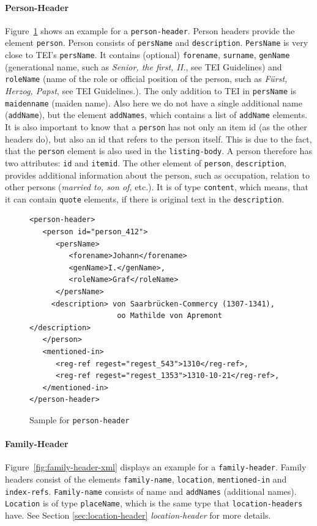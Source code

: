 \paragraph{Person-Header}
\label{sec:person-header}
Figure~\ref{fig:person-header-xml} shows an example for a \texttt{person-header}. Person headers provide the element \texttt{person}. Person consists of \texttt{persName} and \texttt{description}. \texttt{PersName} is very close to TEI's \texttt{persName}. It contains (optional) \texttt{forename}, \texttt{surname}, \texttt{genName} (generational name, such as \textit{Senior, the first, II.}, see TEI Guidelines) and \texttt{roleName} (name of the role or official position of the person, such as \textit{Fürst, Herzog, Papst}, see TEI Guidelines.). The only addition to TEI in \texttt{persName} is \texttt{maidenname} (maiden name). Also here we do not have a single additional name (\texttt{addName}), but the element \texttt{addNames}, which contains a list of \texttt{addName} elements. It is also important to know that a \texttt{person} has not only an item id (as the other headers do), but also an id that refers to the person itself. This is due to the fact, that the \texttt{person} element is also used in the \texttt{listing-body}. A person therefore has two attributes: \texttt{id} and \texttt{itemid}.
The other element of \texttt{person}, \texttt{description}, provides additional information about the person, such as occupation, relation to other persons (\textit{married to, son of,} etc.). It is of type \texttt{content}, which means, that it can contain \texttt{quote} elements, if there is original text in the \texttt{description}.

\begin{figure}[H]
\centering
\begin{verbatim}
<person-header>
   <person id="person_412">
      <persName>
         <forename>Johann</forename> 
         <genName>I.</genName>, 
         <roleName>Graf</roleName>
      </persName>
     <description> von Saarbrücken-Commercy (1307-1341), 
                    oo Mathilde von Apremont    </description>
   </person>
   <mentioned-in>
      <reg-ref regest="regest_543">1310</reg-ref>, 
      <reg-ref regest="regest_1353">1310-10-21</reg-ref>, 
   </mentioned-in>
</person-header>
\end{verbatim}
\caption{Sample for \texttt{person-header}}
\label{fig:person-header-xml}
\end{figure}

\paragraph{Family-Header}
Figure~\ref{fig:family-header-xml} displays an example for a \texttt{family-header}. Family headers consist of the elements \texttt{family-name}, \texttt{location}, \texttt{mentioned-in} and \texttt{index-refs}. \texttt{Family-name} consists of name and \texttt{addNames} (additional names). \texttt{Location} is of type \texttt{placeName}, which is the same type that \texttt{location-headers} have. See Section \ref{sec:location-header} \textit{location-header} for more details.

